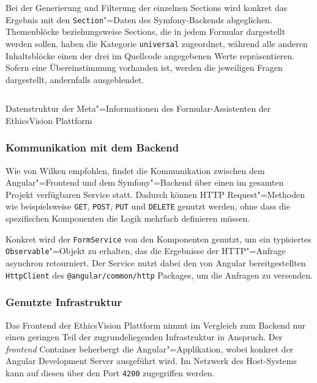 \documentclass[a4paper,12pt,twoside,numbers=noendperiod]{scrreprt}
\begin{document}
Bei der Generierung und Filterung der einzelnen Sections wird konkret das Ergebnis mit den \texttt{Section}"=Daten des Symfony-Backends abgeglichen. Themenblöcke beziehungsweise Sections, die in jedem Formular dargestellt werden sollen, haben die Kategorie \texttt{universal} zugeordnet, während alle anderen Inhaltsblöcke einen der drei im Quellcode angegebenen Werte repräsentieren. Sofern eine Übereinstimmung vorhanden ist, werden die jeweiligen Fragen dargestellt, andernfalls ausgeblendet.

\begin{listing}[ht]
    \inputminted[fontsize=\footnotesize,linenos,xleftmargin=8mm]{typescript}{code/Luidold_Application-Assistant-Result.ts}
    \caption{Datenstruktur der Meta"=Informationen des Formular-Assistenten der EthicsVision Plattform}
    \label{code:application-assistant-result}
\end{listing}

\subsubsection*{Kommunikation mit dem Backend}
\label{sub-sub-sec:angular-kommunikation-backend}

Wie von Wilken empfohlen, findet die Kommunikation zwischen dem Angular"=Frontend und dem Symfony"=Backend über einen im gesamten Projekt verfügbaren Service statt. Dadurch können HTTP Request"=Methoden wie beispielsweise \texttt{GET}, \texttt{POST}, \texttt{PUT} und \texttt{DELETE} genutzt werden, ohne dass die spezifischen Komponenten die Logik mehrfach definieren müssen. \cite[142\psqq]{wilken_angular_2018}

Konkret wird der \texttt{FormService} von den Komponenten genutzt, um ein typisiertes \texttt{Observable}"=Objekt zu erhalten, das die Ergebnisse der HTTP"=Anfrage asynchron retourniert. Der Service nutzt dabei den von Angular bereitgestellten \texttt{HttpClient} des \texttt{@angular/common/http} Packages, um die Anfragen zu versenden. \cite{google_llc_2023-angular-http-comm}

\subsubsection*{Genutzte Infrastruktur}
\label{sub-sub-sec:frontend-genutzte-infrastruktur}

Das Frontend der EthicsVision Plattform nimmt im Vergleich zum Backend nur einen geringen Teil der zugrundeliegenden Infrastruktur in Anspruch. Der \textit{frontend} Container beherbergt die Angular"=Applikation, wobei konkret der Angular Development Server ausgeführt wird. Im Netzwerk des Host-Systems kann auf diesen über den Port \texttt{4200} zugegriffen werden.
\end{document}
